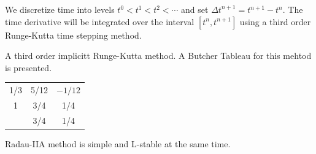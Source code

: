 \documentclass[usenames,dvipsnames,letterpaper,landscape,final]{slides}
\def\dt{{\Delta t}}
\begin{document}
\begin{myslideNoFooter}
We discretize time into levels $t^0<t^1<t^2<\cdots$ and set $\dt^{n+1} = t^{n+1}-t^{n}$. The time derivative will be integrated over the interval $[t^n,t^{n+1}]$ using a third order Runge-Kutta time stepping method.

 A third order implicitt Runge-Kutta method. A Butcher Tableau for this mehtod is presented.\newline
\begin{center}
    \begin{tabular}{c | c c}
        1/3 & 5/12 & $-1/12$ \\
        1  & 3/4  & 1/4 \\
        \hline
          & 3/4 & 1/4
    \end{tabular}
\end{center}

\newline
Radau-IIA method is simple and L-stable at the same time.

\end{myslideNoFooter}

\end{document}

